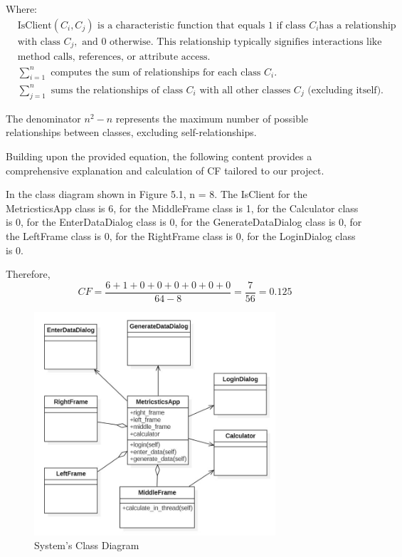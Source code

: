 \documentclass[english,12pt,a4paper]{report}
\begin{document}
	Where:
	\begin{align*}
		& \text{IsClient}(C_i, C_j) \text{ is a characteristic function that equals 1 if class } C_i \text{has a relationship}\\
		& \text{with class } C_j, \text{ and 0 otherwise. This relationship typically signifies interactions like} \\
		& \text{method calls, references, or attribute access.} \\
		& \sum_{i=1}^{n} \text{ computes the sum of relationships for each class } C_i. \\
		& \sum_{j=1}^{n} \text{ sums the relationships of class } C_i \text{ with all other classes } C_j \text{ (excluding itself).}
	\end{align*}
	
	The denominator \(n^2 - n\) represents the maximum number of possible relationships between classes, excluding self-relationships.
	
	\vspace{10pt}
	Building upon the provided equation, the following content provides a comprehensive explanation and calculation of CF tailored to our  project. 
	
	\vspace{10pt}
	In the class diagram shown in Figure 5.1, n = 8. The IsClient for the MetricsticsApp class is 6, for the MiddleFrame class is 1, for the Calculator class is 0, for the EnterDataDialog class is 0,  for the GenerateDataDialog class is 0,  for the LeftFrame class is 0,  for the RightFrame class is 0, for the LoginDialog class is 0.
	
	\vspace{10pt}
	Therefore,
	\begin{equation}
		CF = \frac{6 + 1 + 0 + 0 + 0 + 0 + 0 + 0}{64 - 8} = \frac{7}{56} = 0.125
		\tag{Equation 19}
	\end{equation}
		
	\begin{figure}[h]
		\centering
		\includegraphics[width=0.8\textwidth]{images/uml.jpg}
		\caption{System's Class Diagram}
		\label{fig:System's Class Diagram}
	\end{figure}
	
\end{document}
